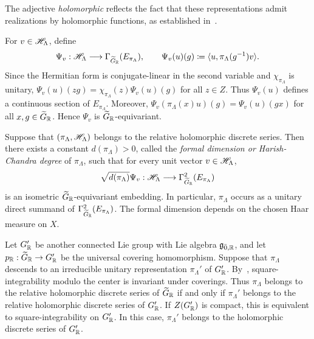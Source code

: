 \begin{remark}
The adjective \emph{holomorphic} reflects the fact that these representations admit realizations by holomorphic functions, as established in~\cite{HC_VI}.
\end{remark}

For $v\in{\mathscr{H}}_{\Lambda}$, define
\begin{equation}
\Psi_v:{\mathscr{H}}_{\Lambda}\longrightarrow
\Gamma_{\widetilde{G}_{{\mathbb R}}}(E_{\pi_{\Lambda}}),
\qquad
\Psi_v(u)(g)\coloneqq
\langle u,\pi_{\Lambda}(g^{-1})v\rangle.
\end{equation}
Since the Hermitian form is conjugate-linear in the second variable and $\chi_{\pi_{\Lambda}}$ is unitary,
$
\Psi_v(u)(zg)=\chi_{\pi_{\Lambda}}(z)\Psi_v(u)(g)
$
for all $z\in Z$. Thus $\Psi_v(u)$ defines a continuous section of $E_{\pi_{\Lambda}}$. Moreover,
$
\Psi_v(\pi_{\Lambda}(x)u)(g)=\Psi_v(u)(gx)
$
for all $x,g\in\widetilde{G}_{{\mathbb R}}$. Hence $\Psi_v$ is $\widetilde{G}_{{\mathbb R}}$-equivariant.

\begin{theorem}
\label{thm::embedding}
Suppose that $(\pi_{\Lambda},{\mathscr{H}}_{\Lambda})$ belongs to the relative holomorphic discrete series. Then there exists a constant $d(\pi_{\Lambda})>0$, called the \emph{formal dimension or Harish-Chandra degree} of $\pi_{\Lambda}$, such that for every unit vector $v\in{\mathscr{H}}_{\Lambda}$,
\begin{equation*}
\sqrt{d(\pi_{\Lambda})}\Psi_v:
{\mathscr{H}}_{\Lambda}
\longrightarrow
\Gamma_{\widetilde{G}_{{\mathbb R}}}^{2}(E_{\pi_{\Lambda}})
\end{equation*}
is an isometric $\widetilde{G}_{{\mathbb R}}$-equivariant embedding. In particular, $\pi_{\Lambda}$ occurs as a unitary direct summand of $\Gamma_{\widetilde{G}_{{\mathbb R}}}^{2}(E_{\pi_{\Lambda}})$. The formal dimension depends on the chosen Haar measure on $X$.
\end{theorem}

\begin{remark}
Let $G_{{\mathbb R}}'$ be another connected Lie group with Lie algebra ${\mathfrak{g}}_{\bar0,{\mathbb R}}$, and let
$
p_{{\mathbb R}}:\widetilde{G}_{{\mathbb R}}\to G_{{\mathbb R}}'
$
be the universal covering homomorphism. Suppose that $\pi_{\Lambda}$ descends to an irreducible unitary representation $\pi_{\Lambda}'$ of $G_{{\mathbb R}}'$. By~\cite[Remark~3.6]{NeebSquareIntegrable}, square-integrability modulo the center is invariant under coverings. Thus $\pi_{\Lambda}$ belongs to the relative holomorphic discrete series of $\widetilde{G}_{{\mathbb R}}$ if and only if $\pi_{\Lambda}'$ belongs to the relative holomorphic discrete series of $G_{{\mathbb R}}'$. If $Z(G_{{\mathbb R}}')$ is compact, this is equivalent to square-integrability on $G_{{\mathbb R}}'$. In this case, $\pi_{\Lambda}'$ belongs to the holomorphic discrete series of $G_{{\mathbb R}}'$.
\end{remark}

